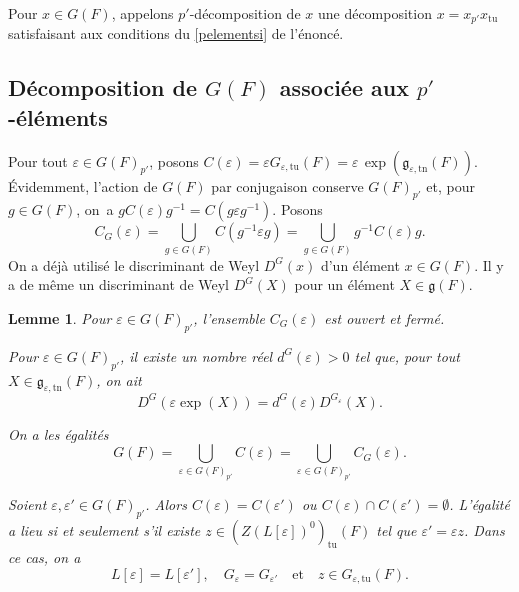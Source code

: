 \documentclass[11pt]{article}
\newcommand{\skpt}{\smallskip}
\numberwithin{equation}{section}\providecommand{\og}{«\,}\providecommand{\fg}{\,»}
\let\oldenumerate\enumerate
\renewcommand{\enumerate}{\oldenumerate\itemindent0pt}
\newenvironment{enumeratei}
{\bgroup\def\theenumi{\roman{enumi}}\def\theenumii{\arabic{enumii}}\oldenumerate}
{\endenumerate\egroup}
\let\epsilon\varepsilon
\newcommand{\quadet}{\quad\text{et}\quad}
\newcommand{\frg}{\mathfrak{g}}
\newcommand{\tn}{\mathrm{tn}}
\newcommand{\tu}{\mathrm{tu}}
\theoremstyle{plain}
\newtheorem*{lem*}{Lemme}
\theoremstyle{definition}
\begin{document}
Pour $x\in G(F)$, appelons $p'$-décomposition de $x$ une décomposition $x=x_{p'}x_{\tu}$ satisfaisant aux conditions du \eqref{pelementsi} de l'énoncé.

\subsection{Décomposition de \texorpdfstring{$G(F)$}{GF} associée aux \texorpdfstring{$p'$}{p'}-éléments}\label{p'decomposition}

Pour tout $\epsilon\in G(F)_{p'}$, posons $C(\epsilon)=\epsilon G_{\epsilon,\tu}(F)=\epsilon\,\exp(\frg_{\epsilon,\tn}(F))$. Évidemment, l'action de $G(F)$ par conjugaison conserve $G(F)_{p'}$ et, pour $g\in G(F)$, on~a $gC(\epsilon)g^{-1}=C(g\epsilon g^{-1})$. Posons
\[
C_{G}(\epsilon)=\bigcup_{g\in G(F)}C(g^{-1}\epsilon g)=\bigcup_{g\in G(F)}g^{-1}C(\epsilon )g.
\]
On a déjà utilisé le discriminant de Weyl $D^G(x)$ d'un élément $x\in G(F)$. Il y a de même un discriminant de Weyl $D^G(X)$ pour un élément $X\in \frg(F)$.

\skpt
\begin{lem*}
\begin{enumeratei}
\item\label{p'decompositioni}
Pour $\epsilon\in G(F)_{p'}$, l'ensemble $C_{G}(\epsilon) $ est ouvert et fermé.

\item\label{p'decompositionii}
Pour $\epsilon\in G(F)_{p'}$, il existe un nombre réel $d^G(\epsilon)>0$ tel que, pour tout $X\in \frg_{\epsilon,\tn}(F)$, on ait
\[
D^G(\epsilon \exp(X))=d^G(\epsilon)D^{G_{\epsilon}}(X).
\]

\item\label{p'decompositioniii}
On a les égalités
\[
G(F)=\bigcup_{\epsilon\in G(F)_{p'}}C(\epsilon)=\bigcup_{\epsilon\in G(F)_{p'}}C_{G}(\epsilon).
\]

\item\label{p'decompositioniv}
Soient $\epsilon ,\epsilon '\in G(F)_{p'}$. Alors $C(\epsilon )=C(\epsilon ')$ ou $C(\epsilon )\cap C(\epsilon ')=\emptyset$. L'égalité a lieu si et seulement s'il existe $z\in (Z(L[\epsilon ])^0)_{\tu}(F)$ tel que $\epsilon '=\epsilon z$. Dans ce cas, on a
\[
L[\epsilon ]=L[\epsilon '],\quad G_{\epsilon}=G_{\epsilon'}\quadet z\in G_{\epsilon,\tu}(F).
\]
\end{enumeratei}
\end{lem*}
\end{document}
